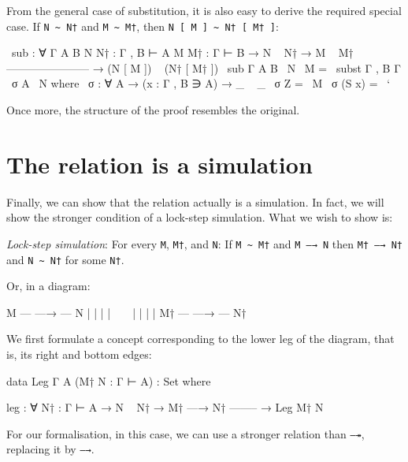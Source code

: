 From the general case of substitution, it is also easy to derive the
required special case. If \texttt{N\ \textasciitilde{}\ N†} and
\texttt{M\ \textasciitilde{}\ M†}, then
\texttt{N\ {[}\ M\ {]}\ \textasciitilde{}\ N†\ {[}\ M†\ {]}}:

\begin{fence}
\begin{code}
~sub : ∀ {Γ A B} {N N† : Γ , B ⊢ A} {M M† : Γ ⊢ B}
  → N ~ N†
  → M ~ M†
    -----------------------
  → (N [ M ]) ~ (N† [ M† ])
~sub {Γ} {A} {B} ~N ~M = ~subst {Γ , B} {Γ} ~σ {A} ~N
  where
  ~σ : ∀ {A} → (x : Γ , B ∋ A) → _ ~ _
  ~σ Z      =  ~M
  ~σ (S x)  =  ~`
\end{code}
\end{fence}

Once more, the structure of the proof resembles the original.

\hypertarget{the-relation-is-a-simulation}{%
\section{The relation is a
simulation}\label{the-relation-is-a-simulation}}

Finally, we can show that the relation actually is a simulation. In
fact, we will show the stronger condition of a lock-step simulation.
What we wish to show is:

\emph{Lock-step simulation}: For every \texttt{M}, \texttt{M†}, and
\texttt{N}: If \texttt{M\ \textasciitilde{}\ M†} and \texttt{M\ —→\ N}
then \texttt{M†\ —→\ N†} and \texttt{N\ \textasciitilde{}\ N†} for some
\texttt{N†}.

Or, in a diagram:

\begin{myDisplay}
M  --- —→ --- N
|             |
|             |
~             ~
|             |
|             |
M† --- —→ --- N†
\end{myDisplay}

We first formulate a concept corresponding to the lower leg of the
diagram, that is, its right and bottom edges:

\begin{fence}
\begin{code}
data Leg {Γ A} (M† N : Γ ⊢ A) : Set where

  leg : ∀ {N† : Γ ⊢ A}
    → N ~ N†
    → M† —→ N†
      --------
    → Leg M† N
\end{code}
\end{fence}

For our formalisation, in this case, we can use a stronger relation than
\texttt{—↠}, replacing it by \texttt{—→}.

